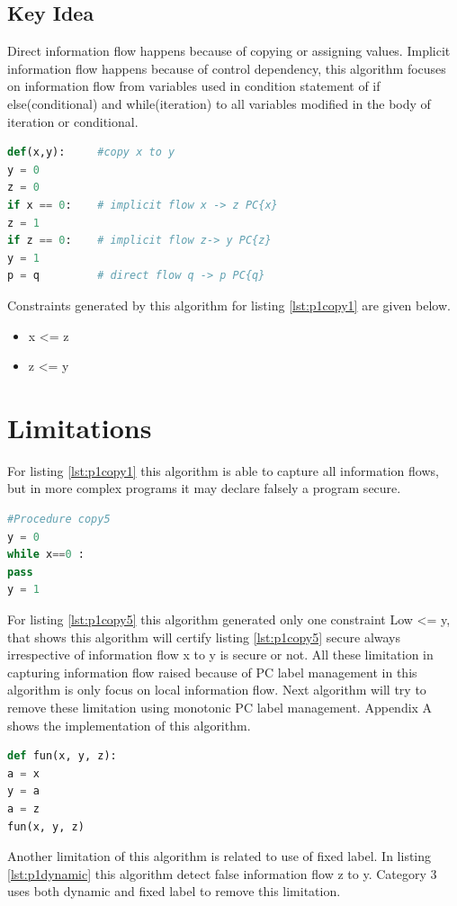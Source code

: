\subsection{Key Idea}
Direct information flow happens because of copying or assigning values. Implicit information flow happens because of control dependency, this algorithm focuses on information flow from variables used in condition statement of if else(conditional)
and while(iteration) to all variables modified in the body of iteration or conditional.
\begin{lstlisting}[language=Python,caption={Python example}, label={lst:p1copy1}]
def(x,y):     #copy x to y
y = 0
z = 0
if x == 0:    # implicit flow x -> z PC{x}
z = 1
if z == 0:    # implicit flow z-> y PC{z}
y = 1
p = q         # direct flow q -> p PC{q}
\end{lstlisting}
Constraints generated by this algorithm for listing \ref{lst:p1copy1} are given below. 
\begin{itemize}
	\item x <= z
	\item z <= y
\end{itemize}
\section{Limitations}
For listing \ref{lst:p1copy1} this algorithm is able to capture all information flows, but in more complex programs it may declare falsely a program secure.
\begin{lstlisting}[language=Python, caption=Python version of copy5 example in \cite{denning}. goal: information flow from x to y, label={lst:p1copy5} ]
#Procedure copy5
y = 0
while x==0 :
pass
y = 1
\end{lstlisting}
For listing \ref{lst:p1copy5} this algorithm generated only one constraint Low <= y, that shows this algorithm will certify listing \ref{lst:p1copy5} secure always irrespective of information flow x to y is secure or not. All these limitation in capturing information flow raised because of PC label management in this algorithm is only focus on local information flow. Next algorithm will try to remove these limitation using monotonic PC label management. Appendix A shows the implementation of this algorithm.
\begin{lstlisting}[language=Python, caption=Python version of dynamic label example in \cite{denning}. goal: information flow from x to y, label={lst:p1dynamic} ]
def fun(x, y, z):
a = x
y = a
a = z
fun(x, y, z)
\end{lstlisting}
Another limitation of this algorithm is related to use of fixed label. In listing \ref{lst:p1dynamic} this algorithm detect false information flow z to y. Category 3 uses both dynamic and fixed label to remove this limitation.
